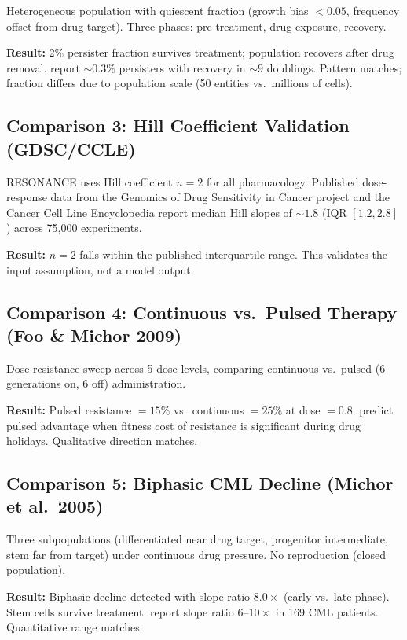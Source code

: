 \documentclass[11pt,a4paper]{article}
\begin{document}
Heterogeneous population with quiescent fraction
(growth bias $< 0.05$, frequency offset from drug target).
Three phases: pre-treatment, drug exposure, recovery.

\textbf{Result:} 2\% persister fraction survives treatment;
population recovers after drug removal.
\citet{sharma2010chromatin} report ${\sim}0.3\%$ persisters with recovery
in ${\sim}9$ doublings.
Pattern matches; fraction differs due to population scale
(50 entities vs.\ millions of cells).

\subsection{Comparison 3: Hill Coefficient Validation (GDSC/CCLE)}

RESONANCE uses Hill coefficient $n{=}2$ for all pharmacology.
Published dose-response data from the Genomics of Drug Sensitivity
in Cancer project \citep{garnett2012systematic} and the Cancer Cell
Line Encyclopedia \citep{barretina2012cancer} report median Hill
slopes of ${\sim}1.8$ (IQR $[1.2, 2.8]$) across 75{,}000 experiments.

\textbf{Result:} $n{=}2$ falls within the published interquartile range.
This validates the input assumption, not a model output.

\subsection{Comparison 4: Continuous vs.\ Pulsed Therapy (Foo \& Michor 2009)}

Dose-resistance sweep across 5 dose levels, comparing continuous
vs.\ pulsed (6 generations on, 6 off) administration.

\textbf{Result:} Pulsed resistance $= 15\%$ vs.\ continuous $= 25\%$
at dose $= 0.8$.
\citet{foo2009evolution} predict pulsed advantage when fitness cost of
resistance is significant during drug holidays.
Qualitative direction matches.

\subsection{Comparison 5: Biphasic CML Decline (Michor et al.\ 2005)}

Three subpopulations (differentiated near drug target,
progenitor intermediate, stem far from target) under continuous
drug pressure. No reproduction (closed population).

\textbf{Result:} Biphasic decline detected with slope ratio $8.0\times$
(early vs.\ late phase). Stem cells survive treatment.
\citet{michor2005dynamics} report slope ratio $6$--$10\times$ in 169 CML patients.
Quantitative range matches.
\end{document}
